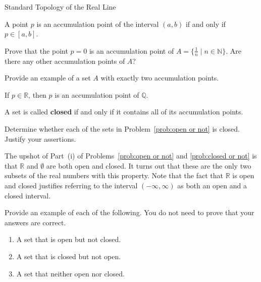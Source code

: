 \begin{section}{Standard Topology of the Real Line}
\begin{theorem}
A point $p$ is an accumulation point of the interval $(a,b)$ if and only if $p\in [a,b]$.
\end{theorem}

\begin{problem}
Prove that the point $p=0$ is an accumulation point of $A=\{\frac{1}{n}\mid n \in \mathbb{N}\}$.  Are there any other accumulation points of $A$? 
\end{problem}


\begin{problem}
Provide an example of a set $A$ with exactly two accumulation points.
\end{problem}

\begin{theorem}
If $p\in\mathbb{R}$, then $p$ is an accumulation point of $\mathbb{Q}$.
\end{theorem}

\begin{definition}
A set is called \textbf{closed} if and only if it contains all of its accumulation points.
\end{definition}

\begin{problem}\label{prob:closed or not}
Determine whether each of the sets in Problem~\ref{prob:open or not} is closed. Justify your assertions.
\end{problem}

The upshot of Part~(i) of Problems~\ref{prob:open or not} and \ref{prob:closed or not} is that $\mathbb{R}$ and $\emptyset$ are both open and closed.  It turns out that these are the only two subsets of the real numbers with this property.  Note that the fact that $\mathbb{R}$ is open and closed justifies referring to the interval $(-\infty, \infty)$ as both an open and a closed interval.

\begin{problem}
Provide an example of each of the following.  You do not need to prove that your answers are correct.
\begin{enumerate}[label=\textrm{(\alph*)}]
\item A set that is open but not closed.
\item A set that is closed but not open.
\item A set that neither open nor closed.
\end{enumerate}
\end{problem}


\end{section}
